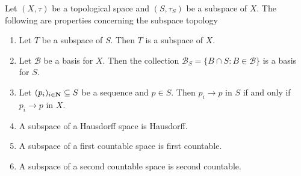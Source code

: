\begin{proposition}\label{prop: subspace properties}
Let \((X, \tau)\) be a topological space and \((S, \tau_S)\) be a
subspace of \(X\). The following are properties concerning the subspace
topology
\begin{enumerate}[(SP1)]\setlength\itemsep{0em}
\item\label{prop: subspace transitivity} Let \(T\) be a subspace of \(S\). Then
  \(T\) is a subspace of \(X\).  \item\label{prop: basis for subspace} Let
  \(\mathcal B\) be a basis for \(X\). Then the collection
  \(\mathcal B_S = \{B \cap S \colon B \in \mathcal B\}\) is a basis for \(S\).
  \item\label{prop: convergence subspace}
    Let \((p_i)_{i \in \mathbf{N}} \subseteq S\) be a sequence and \(p \in
    S\). Then \(p_i \to p\) in \(S\) if and only if \(p_i \to p\) in \(X\).
  \item\label{prop: Hausdorff implies Hausdorff subspace}
    A subspace of a Hausdorff space is Hausdorff.
  \item\label{prop: firs count implies first count subspace}
    A subspace of a first countable space is first countable.
  \item\label{prop: sec count implies sec count subspace}
    A subspace of a second countable space is second countable.
\end{enumerate}
\end{proposition}

